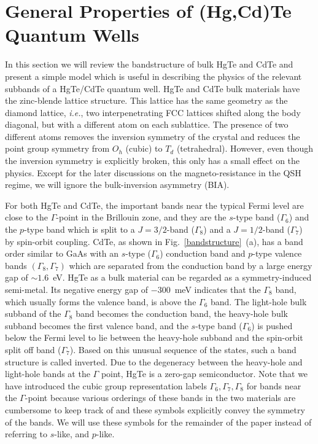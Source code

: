 \documentclass{article}
\begin{document}
\section{General Properties of (Hg,Cd)Te Quantum Wells}
In this section we will review the bandstructure of bulk HgTe and
CdTe and present a simple model which is useful in describing the
physics of the relevant subbands of a HgTe/CdTe quantum well. HgTe
and CdTe bulk materials have the zinc-blende lattice structure. This
lattice has the same geometry as the diamond lattice, \emph{i.e.},
two interpenetrating FCC lattices shifted along the body diagonal,
but with a different atom on each sublattice. The presence of two
different atoms removes the inversion symmetry of the crystal and
reduces the point group symmetry from $O_h$ (cubic) to $T_d$
(tetrahedral). However, even though the inversion symmetry is
explicitly broken, this only has a small effect on the physics.
Except for the later discussions on the magneto-resistance in the
QSH regime, we will ignore the bulk-inversion asymmetry (BIA).

For both HgTe and CdTe, the important bands near the typical Fermi
level are close to the $\Gamma$-point in the Brillouin zone, and
they are the $s$-type band ($\Gamma_6$) and the $p$-type band which
is split to a $J=3/2$-band ($\Gamma_8$) and a $J=1/2$-band
($\Gamma_7$) by spin-orbit coupling. CdTe, as shown in
Fig.~\ref{bandstructure}~(a), has a band order similar to GaAs with
an $s$-type ($\Gamma_6$) conduction band and $p$-type valence bands
$(\Gamma_8,\Gamma_7)$ which are separated from the conduction band
by a large energy gap of $\sim 1.6$~eV. HgTe as a bulk material can
be regarded as a symmetry-induced semi-metal. Its negative energy
gap of $-300$~meV indicates that the $\Gamma_8$ band, which usually
forms the valence band, is above the $\Gamma_6$ band. The light-hole
bulk subband of the $\Gamma_8$ band becomes the conduction band, the
heavy-hole bulk subband becomes the first valence band, and the
$s$-type band ($\Gamma_6$) is pushed below the Fermi level to lie
between the heavy-hole subband and the spin-orbit split off band
($\Gamma_7$). Based on this unusual sequence of the states, such a
band structure is called inverted. Due to the degeneracy between the
heavy-hole and light-hole bands at the $\Gamma$ point, HgTe is a
zero-gap semiconductor. Note that we have introduced the cubic group
representation labels $\Gamma_6,\Gamma_7,\Gamma_8$ for bands near
the $\Gamma$-point because various orderings of these bands in the
two materials are cumbersome to keep track of and these symbols
explicitly convey the symmetry of the bands. We will use these
symbols for the remainder of the paper instead of referring to
$s$-like, and $p$-like.
\end{document}

